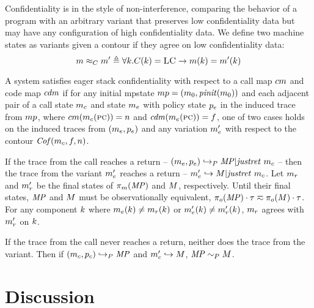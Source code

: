 \documentclass[acmsmall,review,anonymous]{acmart}\settopmatter{printfolios=true,printccs=false,printacmref=false}
\begin{document}

  Confidentiality is in the style of non-interference, comparing the behavior
  of a program with an arbitrary variant that preserves low confidentiality data
  but may have any configuration of high confidentiality data. We define two
  machine states as variants given a contour if they agree on low
  confidentiality data:
  \[m \approx_C m' \triangleq \forall k .
    C(k) = \textsc{LC} \rightarrow m(k) =
    m'(k)\]

  A system satisfies eager stack confidentiality with respect to a call map
  \(cm\) and code map \(\mathit{cdm}\) if for any initial mpstate
  \(mp = (m_0,\mathit{pinit}(m_0))\) and each
  adjacent pair of a call state \(m_c\) and state \(m_e\) with policy
  state \(p_e\) in the induced trace from \(mp\), where
  \(cm(m_c(\textsc{pc})) = n\) and \(\mathit{cdm}(m_e(\textsc{pc})) =
  f\), one of two cases holds on the induced traces from
  \((m_e,p_e)\) and any variation \(m_e'\) with respect
  to the contour \(\mathit{Cof}(m_c,f,n)\).

  If the trace from the call reaches a return -- \((m_e,p_e)
  \hookrightarrow_P \mathit{MP} | \mathit{justret}\ m_c\) -- then the trace from the variant
  \(m_e'\) reaches a return -- \(m_e' \hookrightarrow M |
  \mathit{justret}\ m_c\). Let \(m_r\) and \(m_r'\) be the final states of
  \(\pi_m(\mathit{MP})\) and \(M\), respectively. Until their final states,
  \(\mathit{MP}\) and \(M\) must be observationally equivalent, \(\pi_o(\mathit{MP})
  \cdot \tau \eqsim \pi_o(M) \cdot \tau\). For any component
  \(k\) where \(m_e(k) \not = m_r(k)\) or
  \(m_e'(k) \not = m_r'(k)\),
  \(m_r\) agrees with \(m_r'\) on \(k\).

  If the trace from the call never reaches a return, neither does the
  trace from the variant. Then if \((m_c,p_c) \hookrightarrow_P
  \mathit{MP}\) and \(m_c' \hookrightarrow M\), \(\mathit{MP} \sim_P M\).


\section{Discussion}
\end{document}
